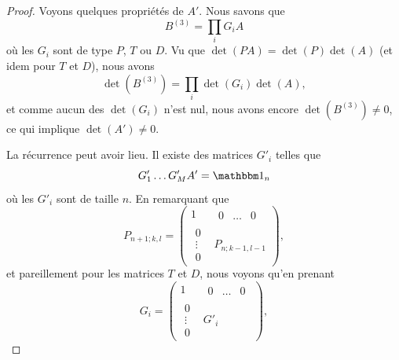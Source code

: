 \begin{proof}
    Voyons quelques propriétés de \( A'\). Nous savons que
    \begin{equation}
        B^{(3)}=\prod_i G_iA
    \end{equation}
    où les \( G_i\) sont de type \( P\), \( T\) ou \( D\). Vu que \( \det(PA)=\det(P)\det(A)\) (et idem pour \( T\) et \( D\)), nous avons
    \begin{equation}
        \det(B^{(3)})=\prod_i\det(G_i)\det(A),
    \end{equation}
    et comme aucun des \( \det(G_i)\) n'est nul, nous avons encore \( \det(B^{(3)})\neq 0\), ce qui implique \( \det(A')\neq 0\).

    La récurrence peut avoir lieu. Il existe des matrices \( G'_i\) telles que
    \begin{equation}
        G'_1\ldots G'_MA'=\mtu_n
    \end{equation}
    où les \( G'_i\) sont de taille \( n\). En remarquant que
    \begin{equation}
       P_{n+1; k,l} =\begin{pmatrix}
            1    &   \begin{matrix} 
                0    &   \ldots    &   0    
            \end{matrix}\\ 
            \begin{matrix}
                0    \\ 
                \vdots    \\ 
                0    
            \end{matrix}& P_{n; k-1,l-1}
        \end{pmatrix},
    \end{equation}
    et pareillement pour les matrices \( T\) et \( D\), nous voyons qu'en prenant
    \begin{equation}
       G_i =\begin{pmatrix}
            1    &   \begin{matrix} 
                0    &   \ldots    &   0    
            \end{matrix}\\ 
            \begin{matrix}
                0    \\ 
                \vdots    \\ 
                0    
            \end{matrix}& G'_i
        \end{pmatrix},
    \end{equation}

\end{proof}

